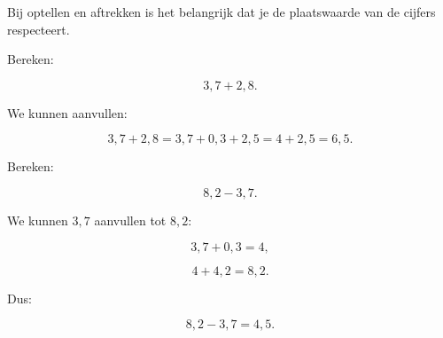 \documentclass{ximera}
\begin{document}


Bij optellen en aftrekken is het belangrijk dat je de plaatswaarde van de
cijfers respecteert.

\begin{voorbeeld}

Bereken:

\[
3{,}7+2{,}8.
\]

We kunnen aanvullen:

\[
3{,}7+2{,}8
=
3{,}7+0{,}3+2{,}5
=
4+2{,}5
=
6{,}5.
\]

\end{voorbeeld}


\begin{voorbeeld}

Bereken:

\[
8{,}2-3{,}7.
\]

We kunnen \(3{,}7\) aanvullen tot \(8{,}2\):

\[
3{,}7+0{,}3=4,
\]

\[
4+4{,}2=8{,}2.
\]

Dus:

\[
8{,}2-3{,}7=4{,}5.
\]

\end{voorbeeld}
\end{document}
